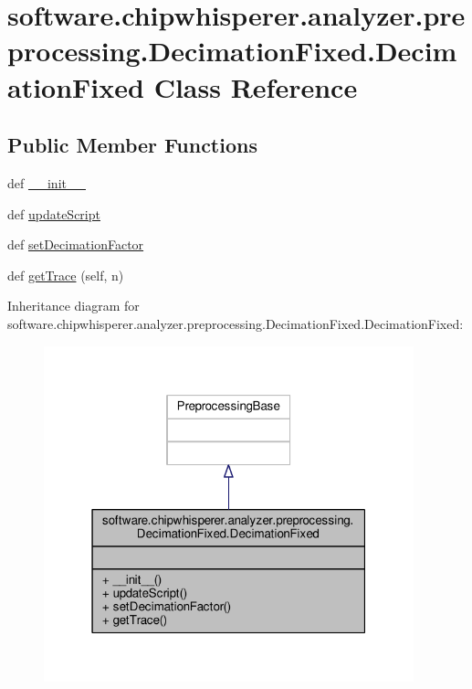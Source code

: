 \hypertarget{classsoftware_1_1chipwhisperer_1_1analyzer_1_1preprocessing_1_1DecimationFixed_1_1DecimationFixed}{}\section{software.\+chipwhisperer.\+analyzer.\+preprocessing.\+Decimation\+Fixed.\+Decimation\+Fixed Class Reference}
\label{classsoftware_1_1chipwhisperer_1_1analyzer_1_1preprocessing_1_1DecimationFixed_1_1DecimationFixed}
\subsection*{Public Member Functions}
\begin{DoxyCompactItemize}
\item 
def \hyperlink{classsoftware_1_1chipwhisperer_1_1analyzer_1_1preprocessing_1_1DecimationFixed_1_1DecimationFixed_a303b274795aa35631678204300d3456f}{\+\_\+\+\_\+init\+\_\+\+\_\+}
\item 
def \hyperlink{classsoftware_1_1chipwhisperer_1_1analyzer_1_1preprocessing_1_1DecimationFixed_1_1DecimationFixed_ad424ada12360da0d5bd081ba0817235f}{update\+Script}
\item 
def \hyperlink{classsoftware_1_1chipwhisperer_1_1analyzer_1_1preprocessing_1_1DecimationFixed_1_1DecimationFixed_a5dab6641c9fcab300990e2b7aee0a5bc}{set\+Decimation\+Factor}
\item 
def \hyperlink{classsoftware_1_1chipwhisperer_1_1analyzer_1_1preprocessing_1_1DecimationFixed_1_1DecimationFixed_a0b986d2e0cd2c212bfe551dbaff2dd71}{get\+Trace} (self, n)
\end{DoxyCompactItemize}


Inheritance diagram for software.\+chipwhisperer.\+analyzer.\+preprocessing.\+Decimation\+Fixed.\+Decimation\+Fixed\+:\nopagebreak
\begin{figure}[H]
\begin{center}
\leavevmode
\includegraphics[width=304pt]{d2/de2/classsoftware_1_1chipwhisperer_1_1analyzer_1_1preprocessing_1_1DecimationFixed_1_1DecimationFixed__inherit__graph}
\end{center}
\end{figure}


